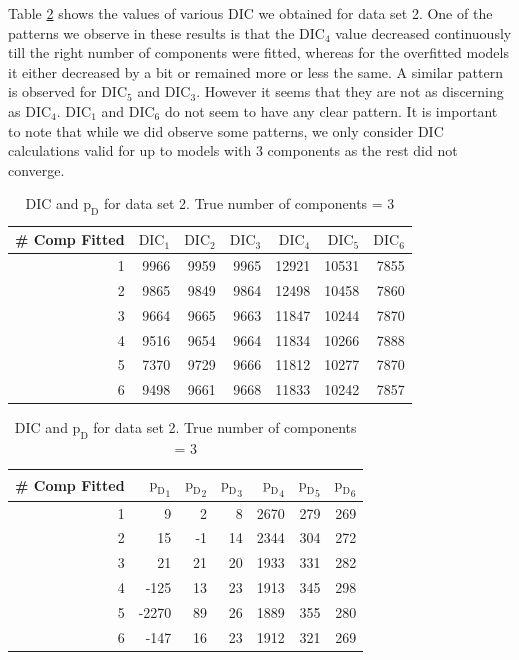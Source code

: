 Table \ref{table : ds_3wellsep_dic} shows the values of various DIC we obtained for data set 2. One of the patterns we observe in these results is that the $\text{DIC}_4$ value decreased continuously till the right number of components were fitted, whereas for the overfitted models it either decreased by a bit or remained more or less the same. A similar pattern is observed for $\text{DIC}_5$ and $\text{DIC}_3$. However it seems that they are not as discerning as $\text{DIC}_4$. $\text{DIC}_1$ and $\text{DIC}_6$ do not seem to have any clear pattern. It is important to note that while we did observe some patterns, we only consider DIC calculations valid for up to models with 3 components as the rest did not converge.\\

\begin{table}[!htb]
\centering
\captionsetup{justification=centering}
\caption{DIC and $\text{p}_\text{D}$ for data set 2. True number of components = 3}
\label{table : ds_3wellsep_dic} 
\begin{tabular}{@{}rrrrrrr@{}}
\toprule
\# Comp Fitted & $\text{DIC}_1$ & $\text{DIC}_2$  & $\text{DIC}_3$  & $\text{DIC}_4$  & $\text{DIC}_5$  & $\text{DIC}_6$  \\ \midrule
1 & 9966 & 9959 & 9965 & 12921 & 10531 & 7855 \\
2 & 9865 & 9849 & 9864 & 12498 & 10458 & 7860 \\
3 & 9664 & 9665 & 9663 & 11847 & 10244 & 7870 \\
4 & 9516 & 9654 & 9664 & 11834 & 10266 & 7888 \\
5 & 7370 & 9729 & 9666 & 11812 & 10277 & 7870 \\
6 & 9498 & 9661 & 9668 & 11833 & 10242 & 7857 \\ \bottomrule
\end{tabular}

\begin{tabular}{@{}rrrrrrr@{}}
\toprule
\# Comp Fitted & ${\text{p}_\text{D}}_1$ & ${\text{p}_\text{D}}_2$ & ${\text{p}_\text{D}}_3$ & ${\text{p}_\text{D}}_4$ & ${\text{p}_\text{D}}_5$ & ${\text{p}_\text{D}}_6$ \\ \midrule
1 & 9 & 2 & 8 & 2670 & 279 & 269 \\
2 & 15 & -1 & 14 & 2344 & 304 & 272 \\
3 & 21 & 21 & 20 & 1933 & 331 & 282 \\
4 & -125 & 13 & 23 & 1913 & 345 & 298 \\
5 & -2270 & 89 & 26 & 1889 & 355 & 280 \\
6 & -147 & 16 & 23 & 1912 & 321 & 269 \\ \bottomrule
\end{tabular}
\end{table}

